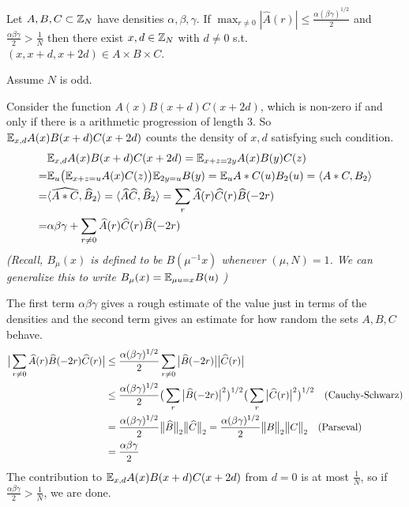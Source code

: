 \documentclass[12pt,a4paper]{report}
\renewcommand{\hat}{\widehat}
\newenvironment{proof}
{\begin{changemargin}{1cm}{0.5cm}
	}%
	{\end{changemargin}
}
\begin{document}
 Let $A,B,C \subset \mathbb{Z}_N$ have densities $\alpha,\beta,\gamma$. If $\max_{r\neq 0} |\hat{A}(r)| \leq \frac{\alpha(\beta \gamma)^{1/2}}{2}$ and $\frac{\alpha \beta \gamma}{2} > \frac{1}{N}$ then there exist $x, d \in \mathbb{Z}_N$ with $d\neq 0$ s.t. $(x,x+d,x+2d) \in A \times B \times C$.
\begin{proof}
\pf Assume $N$ is odd.

Consider the function $A(x)B(x+d)C(x+2d)$, which is non-zero if and only if there is a arithmetic progression of length 3. So $\mathbb{E}_{x,d} A(x)B(x+d)C(x+2d)$ counts the density of $x,d$ satisfying such condition.
\begin{align*}
& \avg_{x,d}A(x)B(x+d)C(x+2d) = \avg_{x+z =2y}A(x)B(y)C(z) \\
=& \avg_{u}\big( \avg_{x+z =u} A(x)C(z) \big) \avg_{2y=u} B(y) = \avg_u A * C(u) B_2(u) = \langle A * C, B_2 \rangle \\
=& \langle \hat{A*C}, \hat{B}_2 \rangle = \langle \hat{A} \hat{C}, \hat{B}_2 \rangle = \sum_r \hat{A}(r) \hat{C}(r) \hat{B}(-2r) \\
=& \alpha \beta \gamma + \sum_{r\neq 0} \hat{A}(r) \hat{C}(r) \hat{B}(-2r)
\end{align*}
\textit{(Recall, $B_{\mu}(x)$ is defined to be $B(\mu^{-1}x)$ whenever $(\mu, N)=1$. We can generalize this to write $B_{\mu}(x) = \mathbb{E}_{\mu u=x}B(u)$  )}

The first term $\alpha \beta \gamma$ gives a rough estimate of the value just in terms of the densities and the second term gives an estimate for how random the sets $A,B,C$ behave.
\begin{align*}
\big|\sum_{r\neq 0} \hat{A}(r) \hat{B}(-2r) \hat{C}(r) \big| &\leq \frac{\alpha (\beta \gamma)^{1/2}}{2} \sum_{r\neq 0} \big|\hat{B}(-2r)\big| \big|\hat{C}(r)\big| \\
&\leq \frac{\alpha (\beta \gamma)^{1/2}}{2} \big( \sum_r \big| \hat{B}(-2r) \big|^2 \big)^{1/2} \big( \sum_r \big| \hat{C}(r) \big|^2 \big)^{1/2} \quad \text{(Cauchy-Schwarz)} \\
& = \frac{\alpha (\beta \gamma)^{1/2}}{2} \norms{\hat{B}}{2} \norms{\hat{C}}{2} = \frac{\alpha (\beta \gamma)^{1/2}}{2} \norms{B}{2} \norms{C}{2} \quad \text{(Parseval)} \\
& = \frac{\alpha \beta \gamma}{2}
\end{align*}
The contribution to $\mathbb{E}_{x,d}A(x)B(x+d)C(x+2d)$ from $d=0$ is at most $\frac{1}{N}$, so if $\frac{\alpha \beta \gamma}{2} > \frac{1}{N}$, we are done.

\eop
\end{proof}
\s
\end{document}
